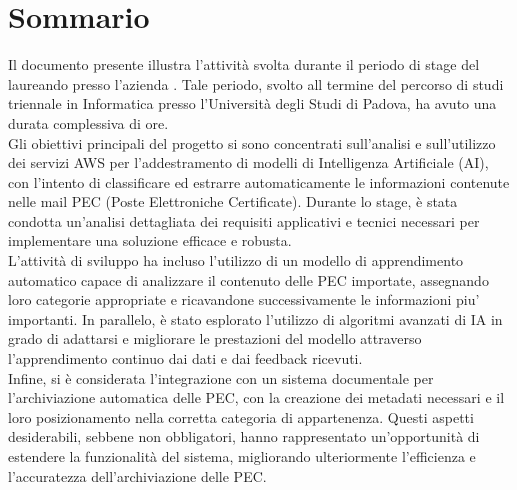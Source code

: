 \cleardoublepage
{}
{}
\begingroup
\let\clearpage\relax
\let\cleardoublepage\relax

\chapter*{Sommario}

Il documento presente illustra l'attività svolta durante il periodo di stage del laureando \myName presso l'azienda \myCompany. Tale periodo, svolto all termine del percorso di studi triennale in Informatica presso l'Università degli Studi di Padova, ha avuto una durata complessiva di \myHours ore. \\
Gli obiettivi principali del progetto si sono concentrati sull'analisi e sull'utilizzo dei servizi AWS per l'addestramento di modelli di Intelligenza Artificiale (AI), con l'intento di classificare ed estrarre automaticamente le informazioni contenute nelle mail PEC (Poste Elettroniche Certificate). Durante lo stage, è stata condotta un'analisi dettagliata dei requisiti applicativi e tecnici necessari per implementare una soluzione efficace e robusta. \\
L'attività di sviluppo ha incluso l'utilizzo di un modello di apprendimento automatico capace di analizzare il contenuto delle PEC importate, assegnando loro categorie appropriate e ricavandone successivamente le informazioni piu' importanti. In parallelo, è stato esplorato l'utilizzo di algoritmi avanzati di IA in grado di adattarsi e migliorare le prestazioni del modello attraverso l'apprendimento continuo dai dati e dai feedback ricevuti. \\
Infine, si è considerata l'integrazione con un sistema documentale per l'archiviazione automatica delle PEC, con la creazione dei metadati necessari e il loro posizionamento nella corretta categoria di appartenenza. Questi aspetti desiderabili, sebbene non obbligatori, hanno rappresentato un'opportunità di estendere la funzionalità del sistema, migliorando ulteriormente l'efficienza e l'accuratezza dell'archiviazione delle PEC. \\

\endgroup
\vfill
